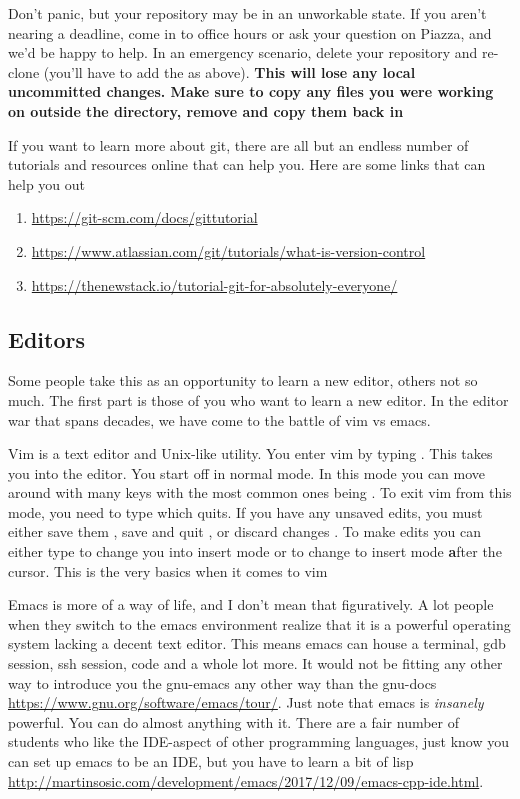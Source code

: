 Don't panic, but your repository may be in an unworkable state. If you aren't nearing a deadline, come in to office hours or ask your question on Piazza, and we'd be happy to help. In an emergency scenario, delete your repository and re-clone (you'll have to add the  as above). \textbf{This will lose any local uncommitted changes. Make sure to copy any files you were working on outside the directory, remove and copy them back in}

If you want to learn more about git, there are all but an endless number of tutorials and resources online that can help you.
Here are some links that can help you out

\begin{enumerate}
\item \url{https://git-scm.com/docs/gittutorial}
\item \url{https://www.atlassian.com/git/tutorials/what-is-version-control}
\item \url{https://thenewstack.io/tutorial-git-for-absolutely-everyone/}
\end{enumerate}

\subsection{Editors}

Some people take this as an opportunity to learn a new editor, others not so much. The first part is those of you who want to learn a new editor. In the editor war that spans decades, we have come to the battle of vim vs emacs.

Vim is a text editor and Unix-like utility. You enter vim by typing . This takes you into the editor. You start off in normal mode. In this mode you can move around with many keys with the most common ones being . To exit vim from this mode, you need to type  which quits. If you have any unsaved edits, you must either save them , save and quit , or discard changes . To make edits you can either type  to change you into insert mode or  to change to insert mode \textbf{a}fter the cursor. This is the very basics when it comes to vim

Emacs is more of a way of life, and I don't mean that figuratively. A lot people when they switch to the emacs environment realize that it is a powerful operating system lacking a decent text editor. This means emacs can house a terminal, gdb session, ssh session, code and a whole lot more. It would not be fitting any other way to introduce you the gnu-emacs any other way than the gnu-docs \url{https://www.gnu.org/software/emacs/tour/}. Just note that emacs is \textit{insanely} powerful. You can do almost anything with it. There are a fair number of students who like the IDE-aspect of other programming languages, just know you can set up emacs to be an IDE, but you have to learn a bit of lisp \url{http://martinsosic.com/development/emacs/2017/12/09/emacs-cpp-ide.html}.

